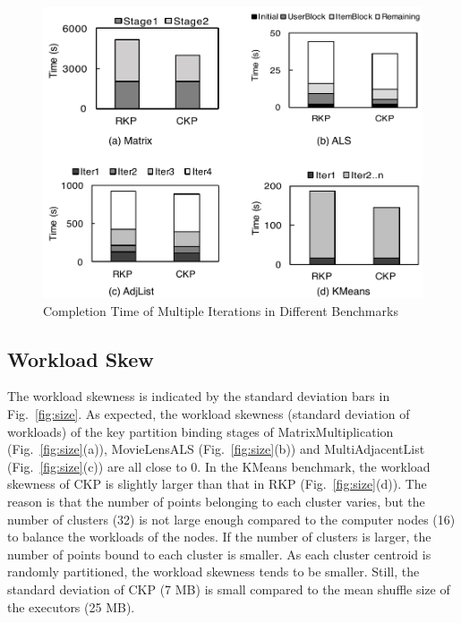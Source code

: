\documentclass[10pt,journal,compsoc]{IEEEtran}
\begin{document}
\begin{figure}[!t]
\centering
\includegraphics[width=1\columnwidth]{time.pdf}
\caption{Completion Time of Multiple Iterations in Different Benchmarks}
\label{fig:time}
\end{figure}

\subsection{Workload Skew}
The workload skewness is indicated by the standard deviation bars in Fig.~\ref{fig:size}. 
As expected, the workload skewness (standard deviation of workloads) of the key partition 
binding stages of MatrixMultiplication (Fig.~\ref{fig:size}(a)), MovieLensALS (Fig.~\ref{fig:size}(b)) and MultiAdjacentList (Fig.~\ref{fig:size}(c)) are all close to 0. 
In the KMeans benchmark, the workload skewness of CKP is slightly larger than that in RKP (Fig.~\ref{fig:size}(d)). 
The reason is that the number of points belonging to each cluster varies, but the number of clusters (32) is not large enough compared to 
the computer nodes (16) to balance the workloads of the nodes. 
If the number of clusters is larger, 
the number of points bound to each cluster is smaller.
As each cluster centroid is randomly partitioned, the workload 
skewness tends to be smaller.
Still, the standard deviation of CKP (7 MB) is small compared to the mean shuffle size of the executors (25 MB).


\end{document}
